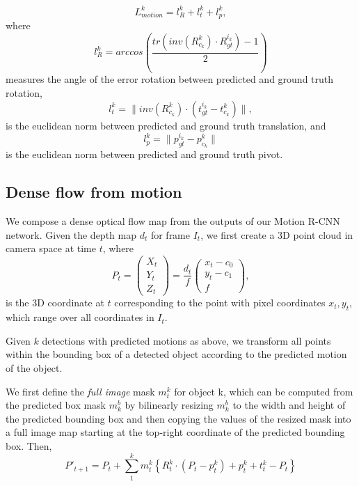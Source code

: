 \begin{equation}
L_{motion}^k =l_{R}^k + l_{t}^k + l_{p}^k,
\end{equation}
where
\begin{equation}
l_{R}^k = arccos\left(\frac{tr(inv(R_{c_k}^k) \cdot R_{gt}^{i_k}) - 1}{2} \right)
\end{equation}
measures the angle of the error rotation between predicted and ground truth rotation,
\begin{equation}
l_{t}^k = \lVert inv(R_{c_k}^k) \cdot (t_{gt}^{i_k} - t_{c_k}^k) \rVert,
\end{equation}
is the euclidean norm between predicted and ground truth translation, and
\begin{equation}
l_{p}^k = \lVert p_{gt}^{i_k} - p_{c_k}^k \rVert
\end{equation}
is the euclidean norm between predicted and ground truth pivot.


\subsection{Dense flow from motion}
We compose a dense optical flow map from the outputs of our Motion R-CNN network.
Given the depth map $d_t$ for frame $I_t$, we first create a 3D point cloud in camera space at time $t$,
where
\begin{equation}
P_t =
\begin{pmatrix}
X_t \\ Y_t \\ Z_t
\end{pmatrix}
=
\frac{d_t}{f}
\begin{pmatrix}
x_t - c_0 \\ y_t - c_1 \\ f
\end{pmatrix},
\end{equation}
is the 3D coordinate at $t$ corresponding to the point with pixel coordinates $x_t, y_t$,
which range over all coordinates in $I_t$.

Given $k$ detections with predicted motions as above, we transform all points within the bounding
box of a detected object according to the predicted motion of the object.

We first define the \emph{full image} mask $m_t^k$ for object k,
which can be computed from the predicted box mask $m_k^b$ by bilinearly resizing
$m_k^b$ to the width and height of the predicted bounding box and then copying the values
of the resized mask into a full image map starting at the top-right coordinate of the predicted bounding box.
Then,
\begin{equation}
P'_{t+1} =
P_t + \sum_1^{k} m_t^k\left\{ R_t^k \cdot (P_t - p_t^k) + p_t^k + t_t^k - P_t \right\}
\end{equation}

